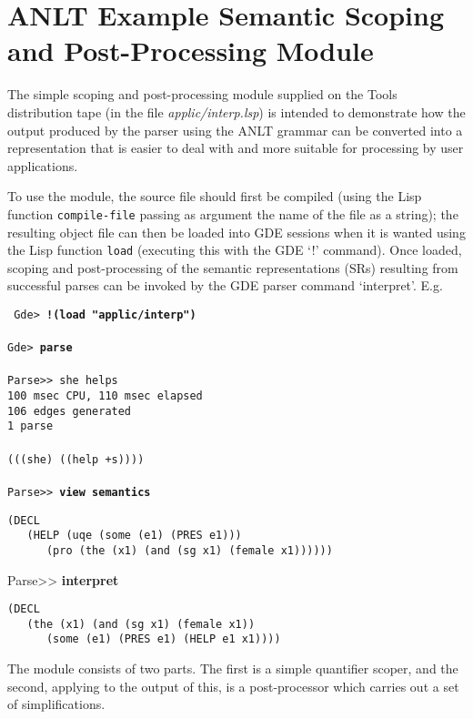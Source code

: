 %
\newenvironment{display}%
   {\begin{center}
    \begin{minipage}[t]{5.4in}}%
   {\end{minipage}
    \end{center}}
%
\newenvironment{ex}%
   {\begin{display}}%
   {\end{display}}
%
\newcommand{\bs}{$\backslash$}
%
 
\chapter*{ANLT Example Semantic Scoping and Post-Processing Module}

The simple scoping and post-processing module supplied on the Tools
distribution tape (in the file {\it applic/interp.lsp}) is intended to
demonstrate how the output produced by the parser using the ANLT grammar
can be converted into a representation that is easier to deal with and
more suitable for processing by user applications.

To use the module, the source file should first be compiled
(using the Lisp function {\tt compile-file} passing as argument the name
of the file as a string); the resulting object file can then be loaded into
GDE sessions when it is wanted using the Lisp function {\tt load} (executing
this with the GDE `!' command). Once loaded, scoping and post-processing
of the semantic representations (SRs) resulting from successful parses can be
invoked by the GDE parser command `interpret'. E.g.
\begin{display}
{\small\tt
Gde> {\bf !(load "applic/interp")}\\
\\
Gde> {\bf parse}\\
\\
Parse>> she helps\\
100 msec CPU, 110 msec elapsed\\
106 edges generated\\
1 parse\\
\\
(((she) ((help +s))))\\
\\
Parse>> {\bf view semantics}
\begin{verbatim}
(DECL
   (HELP (uqe (some (e1) (PRES e1)))
      (pro (the (x1) (and (sg x1) (female x1))))))
\end{verbatim}
Parse>> {\bf interpret}
\begin{verbatim}
(DECL
   (the (x1) (and (sg x1) (female x1))
      (some (e1) (PRES e1) (HELP e1 x1))))

\end{verbatim}
} \end{display}
The module consists of two parts. The first is a simple quantifier scoper, and
the second, applying to the output of this, is a post-processor which
carries out a set of simplifications.
 

